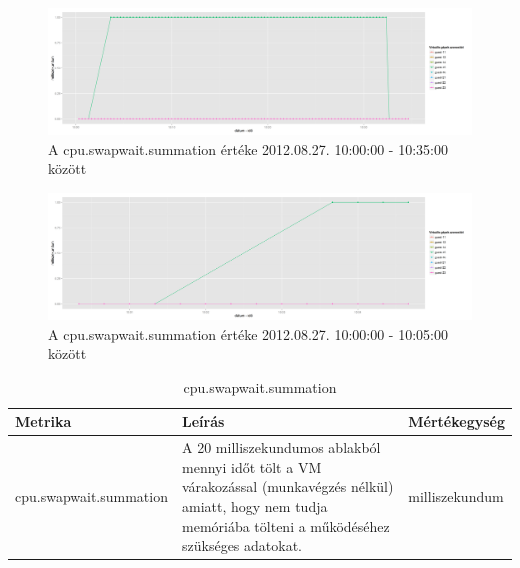 \documentclass[a4paper,10pt,titlepage]{article}
\begin{document}
\begin{figure}[h!]
\centering
\includegraphics[width=1.00\textwidth]{figures/cpu_swapwait_summation-20120827100000-20120827103500.png}
\caption{A cpu.swapwait.summation értéke 2012.08.27. 10:00:00 - 10:35:00 között \label{fig:cpu_swapwait_summation_082701}}
\end{figure}

\begin{figure}[h!]
\centering
\includegraphics[width=1.00\textwidth]{figures/cpu_swapwait_summation-20120827100000-20120827100500.png}
\caption{A cpu.swapwait.summation értéke 2012.08.27. 10:00:00 - 10:05:00 között \label{fig:cpu_swapwait_summation_082702}}
\end{figure}

\begin{table}[h]
	\caption{cpu.swapwait.summation}
	\centering
	\small
	\begin{tabular}{| p{3.5cm} | p{7.5cm} | p{2cm} |}
		\hline
		\rowcolor{tc_bone} \textbf{Metrika} & \textbf{Leírás} & \textbf{Mértékegység} \\
		\hline
		cpu.swapwait.summation & A 20 milliszekundumos ablakból mennyi időt tölt a VM várakozással (munkavégzés nélkül) amiatt, hogy nem tudja memóriába tölteni a működéséhez szükséges adatokat. & milliszekundum \\ 
		\hline
	\end{tabular}
	\normalsize
	\label{tab:cpu.swapwait.summation}
\end{table}

\end{document}
